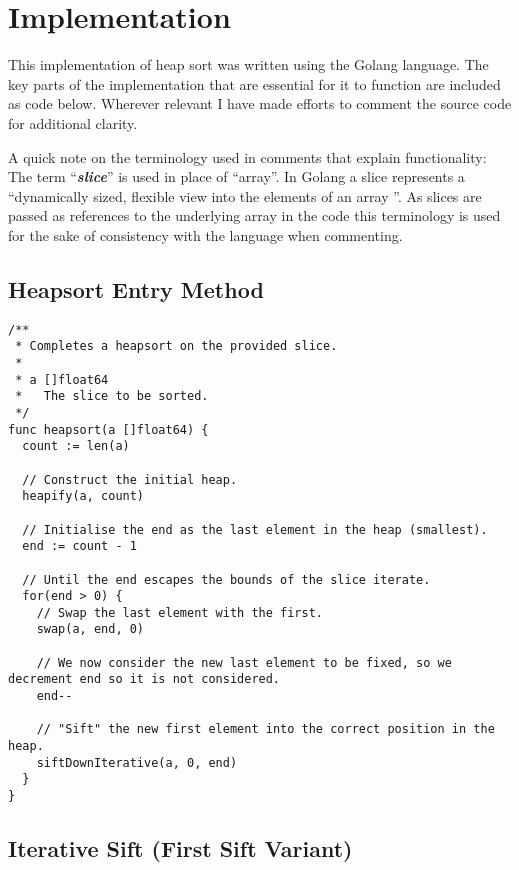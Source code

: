 \documentclass{article}
\begin{document}
\section{Implementation}
This implementation of heap sort was written using the Golang language. The key parts of the implementation that are essential for it to function are included as code below. Wherever relevant I have made efforts to comment the source code for additional clarity.

A quick note on the terminology used in comments that explain functionality:
The term ``\textbf{\textit{slice}}'' is used in place of ``array''. In Golang a slice represents a ``dynamically sized, flexible view into the elements of an array \cite{goslice}''. As slices are passed as references to the underlying array in the code this terminology is used for the sake of consistency with the language when commenting.

\subsection{Heapsort Entry Method}

\begin{lstlisting}[language=Golang, caption=Main control method for the Heap Sort.]
/**
 * Completes a heapsort on the provided slice.
 *
 * a []float64
 *   The slice to be sorted.
 */
func heapsort(a []float64) {
  count := len(a)

  // Construct the initial heap.
  heapify(a, count)

  // Initialise the end as the last element in the heap (smallest).
  end := count - 1

  // Until the end escapes the bounds of the slice iterate.
  for(end > 0) {
    // Swap the last element with the first.
    swap(a, end, 0)

    // We now consider the new last element to be fixed, so we decrement end so it is not considered.
    end--

    // "Sift" the new first element into the correct position in the heap.
    siftDownIterative(a, 0, end)
  }
}
\end{lstlisting}

\subsection{Iterative Sift (First Sift Variant)}
\end{document}
